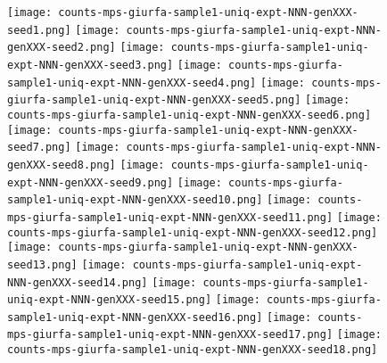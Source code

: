 \documentclass[12pt]{article}
\begin{document}
\begin{figure}
%
  \centering
  \texttt{[image: counts-mps-giurfa-sample1-uniq-expt-NNN-genXXX-seed1.png]}\hspace{-7mm}
  \texttt{[image: counts-mps-giurfa-sample1-uniq-expt-NNN-genXXX-seed2.png]}\hspace{-7mm}
  \texttt{[image: counts-mps-giurfa-sample1-uniq-expt-NNN-genXXX-seed3.png]}\hspace{-7mm}
  \texttt{[image: counts-mps-giurfa-sample1-uniq-expt-NNN-genXXX-seed4.png]}\hspace{-7mm}
  \texttt{[image: counts-mps-giurfa-sample1-uniq-expt-NNN-genXXX-seed5.png]}
%
  \texttt{[image: counts-mps-giurfa-sample1-uniq-expt-NNN-genXXX-seed6.png]}\hspace{-7mm}
  \texttt{[image: counts-mps-giurfa-sample1-uniq-expt-NNN-genXXX-seed7.png]}\hspace{-7mm}
  \texttt{[image: counts-mps-giurfa-sample1-uniq-expt-NNN-genXXX-seed8.png]}\hspace{-7mm}
  \texttt{[image: counts-mps-giurfa-sample1-uniq-expt-NNN-genXXX-seed9.png]}\hspace{-7mm}
  \texttt{[image: counts-mps-giurfa-sample1-uniq-expt-NNN-genXXX-seed10.png]}
%
  \texttt{[image: counts-mps-giurfa-sample1-uniq-expt-NNN-genXXX-seed11.png]}\hspace{-7mm}
  \texttt{[image: counts-mps-giurfa-sample1-uniq-expt-NNN-genXXX-seed12.png]}\hspace{-7mm}
  \texttt{[image: counts-mps-giurfa-sample1-uniq-expt-NNN-genXXX-seed13.png]}\hspace{-7mm}
  \texttt{[image: counts-mps-giurfa-sample1-uniq-expt-NNN-genXXX-seed14.png]}\hspace{-7mm}
  \texttt{[image: counts-mps-giurfa-sample1-uniq-expt-NNN-genXXX-seed15.png]}
%
  \texttt{[image: counts-mps-giurfa-sample1-uniq-expt-NNN-genXXX-seed16.png]}\hspace{-7mm}
  \texttt{[image: counts-mps-giurfa-sample1-uniq-expt-NNN-genXXX-seed17.png]}\hspace{-7mm}
  \texttt{[image: counts-mps-giurfa-sample1-uniq-expt-NNN-genXXX-seed18.png]}\hspace{-7mm}

\end{figure}
\end{document}
